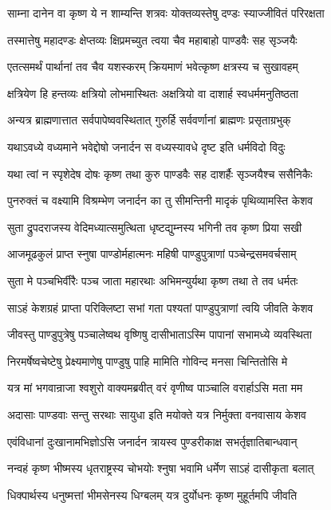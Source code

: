 \twolineshloka
{साम्ना दानेन वा कृष्ण ये न शाम्यन्ति शत्रवः}
{योक्तव्यस्तेषु दण्डः स्याज्जीवितं परिरक्षता}


\twolineshloka
{तस्मात्तेषु महादण्डः क्षेप्तव्यः क्षिप्रमच्युत}
{त्वया चैव महाबाहो पाण्डवैः सह सृञ्जयैः}


\twolineshloka
{एतत्समर्थं पार्थानां तव चैव यशस्करम्}
{क्रियमाणं भवेत्कृष्ण क्षत्रस्य च सुखावहम्}


\twolineshloka
{क्षत्रियेण हि हन्तव्यः क्षत्रियो लोभमास्थितः}
{अक्षत्रियो वा दाशार्ह स्वधर्ममनुतिष्ठता}


\twolineshloka
{अन्यत्र ब्राह्मणात्तात सर्वपापेष्ववस्थितात्}
{गुरुर्हि सर्ववर्णानां ब्राह्मणः प्रसृताग्रभुक्}


\twolineshloka
{यथाऽवध्ये वध्यमाने भवेद्दोषो जनार्दन}
{स वध्यस्यावधे दृष्ट इति धर्मविदो विदुः}


\twolineshloka
{यथा त्वां न स्पृशेदेष दोषः कृष्ण तथा कुरु}
{पाण्डवैः सह दाशर्हैः सृञ्जयैश्च ससैनिकैः}


\twolineshloka
{पुनरुक्तं च वक्ष्यामि विश्रम्भेण जनार्दन}
{का तु सीमन्तिनी मादृकं पृथिव्यामस्ति केशव}


\twolineshloka
{सुता द्रुपदराजस्य वेदिमध्यात्समुत्थिता}
{धृष्टद्युम्नस्य भगिनी तव कृष्ण प्रिया सखी}


\twolineshloka
{आजमूढकुलं प्राप्त स्नुषा पाण्डोर्महात्मनः}
{महिषी पाण्डुपुत्राणां पञ्चेन्द्रसमवर्चसाम्}


\twolineshloka
{सुता मे पञ्चभिर्वीरैः पञ्च जाता महारथाः}
{अभिमन्युर्यथा कृष्ण तथा ते तव धर्मतः}


\twolineshloka
{साऽहं केशग्रहं प्राप्ता परिक्लिष्टा सभां गता}
{पश्यतां पाण्डुपुत्राणां त्वयि जीवति केशव}


\twolineshloka
{जीवस्तु पाण्डुपुत्रेषु पञ्चालेष्वथ वृष्णिषु}
{दासीभाताऽस्मि पापानां सभामध्ये व्यवस्थिता}


\twolineshloka
{निरमर्षेष्वचेष्टेषु प्रेक्ष्यमाणेषु पाण्डुषु}
{पाहि मामिति गोविन्द मनसा चिन्तितोसि मे}


\twolineshloka
{यत्र मां भगवान्राजा श्वशुरो वाक्यमब्रवीत्}
{वरं वृणीष्व पाञ्चालि वरार्हाऽसि मता मम}


\twolineshloka
{अदासाः पाण्डवाः सन्तु सरथाः सायुधा इति}
{मयोक्ते यत्र निर्मुक्ता वनवासाय केशव}


\twolineshloka
{एवंविधानां दुःखानामभिज्ञोऽसि जनार्दन}
{त्रायस्व पुण्डरीकाक्ष सभर्तृज्ञातिबान्धवान्}


\twolineshloka
{नन्वहं कृष्ण भीष्मस्य धृतराष्ट्रस्य चोभयोः}
{श्नुषा भवामि धर्मेण साऽहं दासीकृता बलात्}


\twolineshloka
{धिक्पार्थस्य धनुष्मत्तां भीमसेनस्य धिग्बलम्}
{यत्र दुर्योधनः कृष्ण मुहूर्तमपि जीवति}


